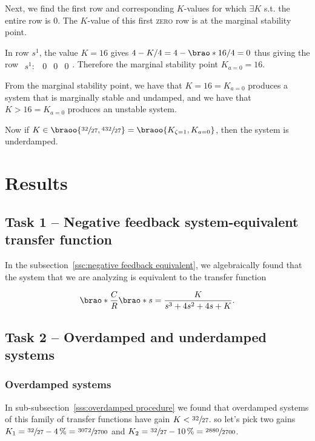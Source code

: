 \documentclass[12pt]{article}
\DeclarePairedDelimiter\brao()%
\begin{document}
Next, we find the first row and corresponding $K$-values for which $\exists K$ s.t. the entire row is $0$.
The $K$-value of this first \textsc{zero} row is at the marginal stability point.

In row $s^1$, the value $K = 16$ gives $4 - K/4 = 4 - \brao*{16}/4 = 0$ thus giving the row $\begin{matrix}s^1: & 0 & 0 & 0\end{matrix}$.
Therefore the marginal stability point $K_{a=0} = 16$.

From the marginal stability point, we have that $K = 16 = K_{a=0}$ produces a system that is marginally stable and undamped, and we have that $K > 16 = K_{a=0}$ produces an unstable system.

Now if $K \in \braoo{\sfrac{32}{27}, \sfrac{432}{27}} = \braoo{K_{\zeta=1}, K_{a=0}}$, then the system is underdamped.

\section{Results}

\subsection{Task 1 -- Negative feedback system-equivalent transfer function}

In the  subsection~\ref{ssc:negative feedback equivalent}, we algebraically found that the system that we are analyzing is equivalent to the transfer function

\begin{equation}
    \brao*{\frac{C}{R}}\brao*s = \frac{K}{s^3 + 4s^2 + 4s + K}.
\end{equation}

\subsection{Task 2 -- Overdamped and underdamped systems}

\subsubsection{Overdamped systems}

In sub-subsection~\ref{sss:overdamped procedure} we found that overdamped systems of this family of transfer functions have gain $K < \sfrac{32}{27}$.
so let's pick two gains $K_1 = \sfrac{32}{27} - \SI4\percent = \sfrac{3072}{2700}$ and $K_2 = \sfrac{32}{27} - \SI{10}\percent = \sfrac{2880}{2700}$.
\end{document}

